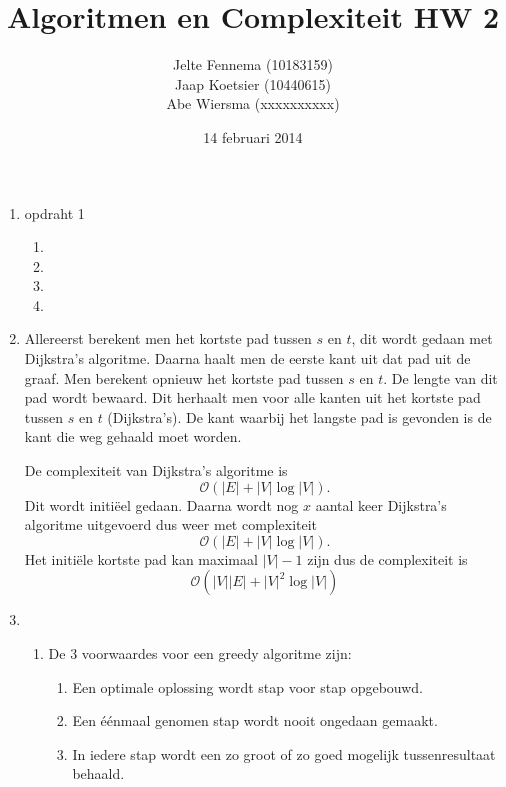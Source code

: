 \documentclass[11pt]{article}
\title{\textbf{Algoritmen en Complexiteit HW 2}}
\author{Jelte Fennema (10183159)\\
		Jaap Koetsier (10440615)\\
        Abe Wiersma (xxxxxxxxxx)}
\date{14 februari 2014}
\newcommand{\bigO}{\ensuremath{\mathcal{O}}}
\begin{document}
\maketitle

\begin{enumerate}
    \item opdraht 1
        \begin{enumerate}
            \item
            \item
            \item
            \item
        \end{enumerate}
    \item
        Allereerst berekent men het kortste pad tussen $s$ en $t$, dit wordt
        gedaan met Dijkstra's algoritme. Daarna haalt men de eerste kant uit dat
        pad uit de graaf. Men berekent opnieuw het kortste pad tussen $s$ en
        $t$. De lengte van dit pad wordt bewaard. Dit herhaalt men voor alle
        kanten uit het kortste pad tussen $s$ en $t$ (Dijkstra's). De kant waarbij het
        langste pad is gevonden is de kant die weg gehaald moet worden.

        De complexiteit van Dijkstra's algoritme is $$\bigO(|E| + |V|\log|V|).$$
        Dit wordt initiëel gedaan. Daarna wordt nog $x$ aantal keer Dijkstra's
        algoritme uitgevoerd dus weer met complexiteit
        $$\bigO(|E| + |V|\log|V|).$$
        Het initiële kortste pad kan maximaal $|V|-1$ zijn dus de complexiteit
        is $$\bigO(|V||E| + |V|^2\log|V|)$$
    \item
        \begin{enumerate}
            \item
                De 3 voorwaardes voor een greedy algoritme zijn:

                \begin{enumerate}[\bfseries 1.]

                    \item Een optimale oplossing wordt stap voor stap opgebouwd.

                    \item Een éénmaal genomen stap wordt nooit ongedaan gemaakt.

                    \item In iedere stap wordt een zo groot of zo goed mogelijk
                        tussenresultaat behaald.

                \end{enumerate}


\end{enumerate}
\end{enumerate}
\end{document}
